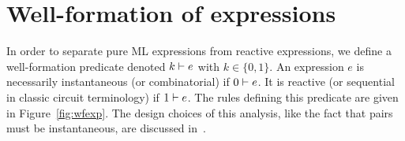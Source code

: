 \documentclass[9pt,preprint]{sigplanconf}
\begin{document}
\appendix

%


\begin{figure*}[t]


\caption{Well-formation rules}
\label{fig:wfexp}
\end{figure*}

\begin{figure*}[t]


\caption{Remaining rules for the big-step semantics}
\label{fig:big_step_other}
\end{figure*}

\vfill
\pagebreak

\section{Well-formation of expressions}
\label{sec:wfexp}

In order to separate pure ML expressions from reactive expressions, we define a well-formation predicate denoted $k \vdash e$ with $k \in \{0, 1\}$. An expression $e$ is necessarily instantaneous (or combinatorial) if $0 \vdash e$. It is reactive (or sequential in classic circuit terminology) if $1 \vdash e$. The rules defining this predicate are given in Figure~\ref{fig:wfexp}. The design choices of this analysis, like the fact that pairs must be instantaneous, are discussed in~\cite{Mandel:2005}.
\end{document}
